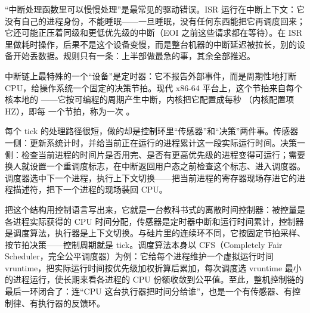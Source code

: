 \begin{warningbox}
“中断处理函数里可以慢慢处理”是最常见的驱动错误。ISR 运行在中断上下文：它没有自己的进程身份，不能睡眠——一旦睡眠，没有任何东西能把它再调度回来；它还可能正压着同级和更低优先级的中断（EOI 之前这些请求都在等待）。在 ISR 里做耗时操作，后果不是这个设备变慢，而是整台机器的中断延迟被拉长，别的设备开始丢数据。规则只有一条：上半部做最急的事，其余全部推迟。
\end{warningbox}


中断链上最特殊的一个“设备”是定时器：它不报告外部事件，而是周期性地打断 CPU，给操作系统一个固定的决策节拍。现代 x86-64 平台上，这个节拍来自每个核本地的 ——它按可编程的周期产生中断，内核把它配置成每秒 （内核配置项 HZ），即每  一个节拍，称为一次 。

每个 tick 的处理路径很短，做的却是控制环里“传感器”和“决策”两件事。传感器一侧：更新系统计时，并给当前正在运行的进程累计这一段实际运行时间。决策一侧：检查当前进程的时间片是否用完、是否有更高优先级的进程变得可运行；需要换人就设置一个重调度标志，在中断返回用户态之前检查这个标志、进入调度器。调度器选中下一个进程，执行上下文切换——把当前进程的寄存器现场存进它的进程描述符，把下一个进程的现场装回 CPU。

把这个结构用控制语言写出来，它就是一台教科书式的离散时间控制器：被控量是各进程实际获得的 CPU 时间分配，传感器是定时器中断和运行时间累计，控制器是调度算法，执行器是上下文切换。与硅片里的连续环不同，它按固定节拍采样、按节拍决策——控制周期就是 tick。调度算法本身以 CFS（Completely Fair Scheduler，完全公平调度器）为例：它给每个进程维护一个虚拟运行时间 vruntime，把实际运行时间按优先级加权折算后累加，每次调度选 vruntime 最小的进程运行，使长期来看各进程的 CPU 份额收敛到公平值。至此，整机控制链的最后一环闭合了：连“CPU 这台执行器把时间分给谁”，也是一个有传感器、有控制律、有执行器的反馈环。

